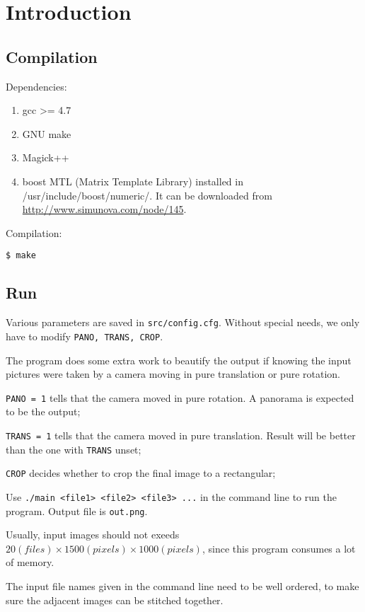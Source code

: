 \section{Introduction}
\subsection{Compilation}
Dependencies:

\begin{enumerate}
    \item gcc >= 4.7
    \item GNU make
    \item Magick++
    \item boost MTL (Matrix Template Library) installed in /usr/include/boost/numeric/.
      It can be downloaded from \url{http://www.simunova.com/node/145}.
\end{enumerate}

Compilation:
\begin{lstlisting}
$ make
\end{lstlisting}

\subsection{Run}
Various parameters are saved in \verb|src/config.cfg|.
Without special needs, we only have to modify \verb|PANO, TRANS, CROP|.

The program does some extra work to beautify the output
if knowing the input pictures were taken by a camera
moving in pure translation or pure rotation.

\verb|PANO = 1| tells that the camera moved in pure rotation. A panorama is expected to be the output;

\verb|TRANS = 1| tells that the camera moved in pure translation. Result will be better than the one with \verb|TRANS| unset;

\verb|CROP| decides whether to crop the final image to a rectangular;

Use \verb|./main <file1> <file2> <file3> ...| in the command line to run the program.
Output file is \verb|out.png|.

Usually, input images should not exeeds $20(files)\times 1500(pixels) \times 1000(pixels)$, since this program consumes a lot of memory.

The input file names given in the command line need to be well ordered, to make sure the adjacent images can be stitched together.

